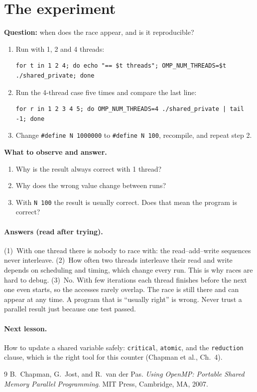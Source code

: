 \documentclass[11pt,a4paper]{article}
\begin{document}
\section{The experiment}
\begin{experiment}
\textbf{Question:} when does the race appear, and is it reproducible?
\begin{enumerate}
  \item Run with 1, 2 and 4 threads:
\begin{lstlisting}[style=sh]
for t in 1 2 4; do echo "== $t threads"; OMP_NUM_THREADS=$t ./shared_private; done
\end{lstlisting}
  \item Run the 4-thread case five times and compare the last line:
\begin{lstlisting}[style=sh]
for r in 1 2 3 4 5; do OMP_NUM_THREADS=4 ./shared_private | tail -1; done
\end{lstlisting}
  \item Change \texttt{\#define N 1000000} to \texttt{\#define N 100}, recompile, and repeat
        step 2.
\end{enumerate}
\textbf{What to observe and answer.}
\begin{enumerate}
  \item Why is the result always correct with 1 thread?
  \item Why does the wrong value change between runs?
  \item With \texttt{N 100} the result is usually correct. Does that mean the program is
        correct?
\end{enumerate}
\end{experiment}

\paragraph{Answers (read after trying).}
(1)~With one thread there is nobody to race with: the read--add--write sequences never
interleave.
(2)~How often two threads interleave their read and write depends on scheduling and
timing, which change every run. This is why races are hard to debug.
(3)~No. With few iterations each thread finishes before the next one even starts, so the
accesses rarely overlap. The race is still there and can appear at any time. A program
that is ``usually right'' is wrong. Never trust a parallel result just because one test
passed.

\paragraph{Next lesson.} How to update a shared variable safely: \texttt{critical},
\texttt{atomic}, and the \texttt{reduction} clause, which is the right tool for this
counter (Chapman et al., Ch.~4).

\begin{thebibliography}{9}
 B.~Chapman, G.~Jost, and R.~van der Pas. \emph{Using OpenMP: Portable
  Shared Memory Parallel Programming}. MIT Press, Cambridge, MA, 2007.
\end{thebibliography}
\end{document}
